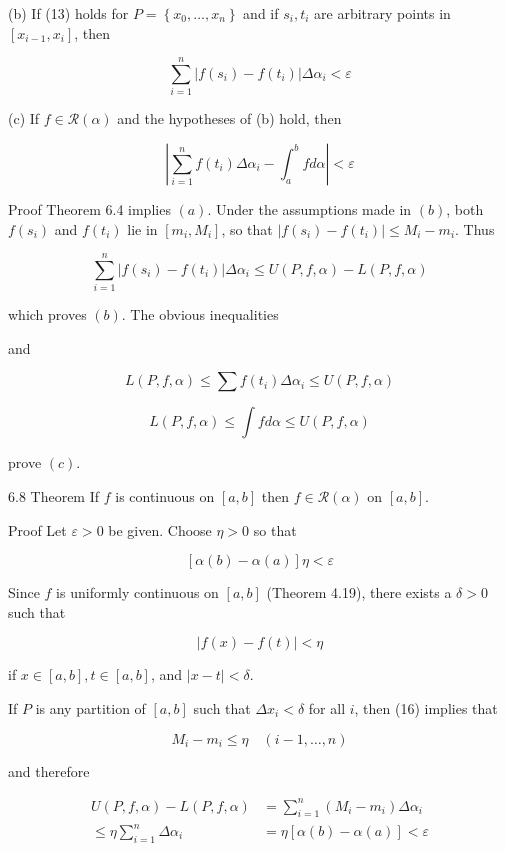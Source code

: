 \documentclass[10pt]{article}
\begin{document}
(b) If (13) holds for $P=\left\{x_{0}, \ldots, x_{n}\right\}$ and if $s_{i}, t_{i}$ are arbitrary points in $\left[x_{i-1}, x_{i}\right]$, then

$$
\sum_{i=1}^{n}\left|f\left(s_{i}\right)-f\left(t_{i}\right)\right| \Delta \alpha_{i}<\varepsilon
$$

(c) If $f \in \mathscr{R}(\alpha)$ and the hypotheses of (b) hold, then

$$
\left|\sum_{i=1}^{n} f\left(t_{i}\right) \Delta \alpha_{i}-\int_{a}^{b} f d \alpha\right|<\varepsilon
$$

Proof Theorem 6.4 implies $(a)$. Under the assumptions made in $(b)$, both $f\left(s_{i}\right)$ and $f\left(t_{i}\right)$ lie in $\left[m_{i}, M_{i}\right]$, so that $\left|f\left(s_{i}\right)-f\left(t_{i}\right)\right| \leq M_{i}-m_{i}$. Thus

$$
\sum_{i=1}^{n}\left|f\left(s_{i}\right)-f\left(t_{i}\right)\right| \Delta \alpha_{i} \leq U(P, f, \alpha)-L(P, f, \alpha)
$$

which proves $(b)$. The obvious inequalities

and

$$
L(P, f, \alpha) \leq \sum f\left(t_{i}\right) \Delta \alpha_{i} \leq U(P, f, \alpha)
$$

$$
L(P, f, \alpha) \leq \int f d \alpha \leq U(P, f, \alpha)
$$

prove $(c)$.

6.8 Theorem If $f$ is continuous on $[a, b]$ then $f \in \mathscr{R}(\alpha)$ on $[a, b]$.

Proof Let $\varepsilon>0$ be given. Choose $\eta>0$ so that

$$
[\alpha(b)-\alpha(a)] \eta<\varepsilon
$$

Since $f$ is uniformly continuous on $[a, b]$ (Theorem 4.19), there exists a $\delta>0$ such that

$$
|f(x)-f(t)|<\eta
$$

if $x \in[a, b], t \in[a, b]$, and $|x-t|<\delta$.

If $P$ is any partition of $[a, b]$ such that $\Delta x_{i}<\delta$ for all $i$, then (16) implies that

$$
M_{i}-m_{i} \leq \eta \quad(i-1, \ldots, n)
$$

and therefore

$$
\begin{aligned}
U(P, f, \alpha)-L(P, f, \alpha) & =\sum_{i=1}^{n}\left(M_{i}-m_{i}\right) \Delta \alpha_{i} \\
\leq \eta \sum_{i=1}^{n} \Delta \alpha_{i} & =\eta[\alpha(b)-\alpha(a)]<\varepsilon
\end{aligned}
$$
\end{document}
